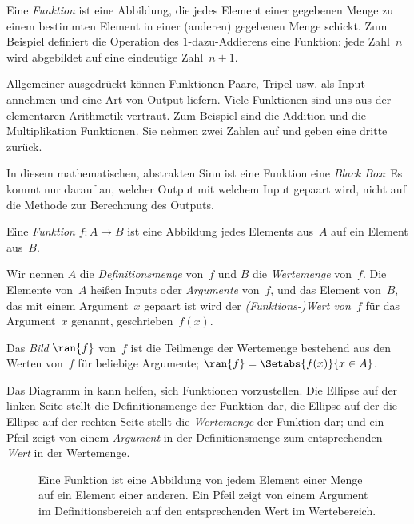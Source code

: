 \documentclass[../../../include/open-logic-section]{subfiles}
\begin{document}

\begin{explain}
  Eine \emph{Funktion} ist eine Abbildung, die jedes Element einer gegebenen Menge
  zu einem bestimmten Element in einer (anderen) gegebenen Menge schickt. Zum Beispiel definiert die
  Operation des $1$-dazu-Addierens eine Funktion: jede Zahl~$n$ wird abgebildet
  auf eine eindeutige Zahl~$n+1$. 
    
  Allgemeiner ausgedrückt können Funktionen Paare, Tripel usw. als Input annehmen und
 eine Art von Output liefern. Viele Funktionen sind uns aus der elementaren
  Arithmetik vertraut. Zum Beispiel sind die Addition und die Multiplikation
  Funktionen. Sie nehmen zwei Zahlen auf und geben eine dritte zurück.
  
  In diesem mathematischen, abstrakten Sinn ist eine Funktion eine \emph{Black
  Box}: Es kommt nur darauf an, welcher Output mit welchem Input gepaart wird, nicht auf
  die Methode zur Berechnung des Outputs.
  \end{explain}
  
  \begin{defn}[Funktion]
  Eine \emph{Funktion} $f \colon A \to B$ ist eine Abbildung jedes Elements
  aus~$A$ auf ein Element aus~$B$.
  
  Wir nennen $A$ die \emph{Definitionsmenge} von~$f$ und $B$ die \emph{Wertemenge}
  von~$f$.  Die Elemente von~$A$ heißen Inputs oder \emph{Argumente}
  von~$f$, und das Element von~$B$, das mit einem Argument~$x$ gepaart ist
  wird der \emph{(Funktions-)Wert von~$f$} für das Argument~$x$ genannt,
  geschrieben~$f(x)$.
  
  Das \emph{Bild} $\ran{f}$ von~$f$ ist die Teilmenge der Wertemenge
  bestehend aus den Werten von~$f$ für beliebige Argumente; $\ran{f} =
  \Setabs{f(x)}{x \in A}$.
  \end{defn}
  
  Das Diagramm in  kann helfen, sich Funktionen vorzustellen. Die Ellipse
  auf der linken Seite stellt die Definitionsmenge der Funktion dar, die Ellipse auf der
  die Ellipse auf der rechten Seite stellt die \emph{Wertemenge} der Funktion dar; und ein Pfeil
  zeigt von einem \emph{Argument} in der Definitionsmenge zum entsprechenden
  \emph{Wert} in der Wertemenge.
  
  \begin{figure}
    \caption{Eine Funktion ist eine Abbildung von jedem Element einer Menge auf
      ein Element einer anderen. Ein Pfeil zeigt von einem Argument im
      Definitionsbereich auf den entsprechenden Wert im Wertebereich.}
  \end{figure}
  
\end{document}
